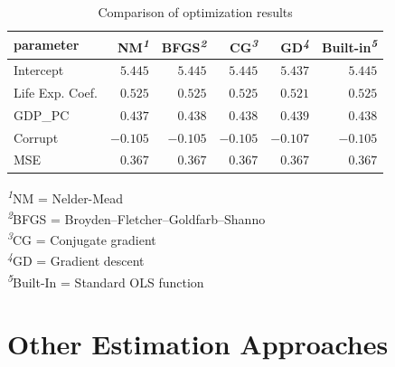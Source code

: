 \documentclass[
  letterpaper,
]{krantz}
\begin{document}
\hypertarget{tbl-optim-compare}{}
\setlength{\LTpost}{0mm}
\begin{longtable}{lrrrrr}
\caption{\label{tbl-optim-compare}Comparison of optimization results }\tabularnewline

\toprule
parameter & NM\textsuperscript{\textit{1}} & BFGS\textsuperscript{\textit{2}} & CG\textsuperscript{\textit{3}} & GD\textsuperscript{\textit{4}} & Built-in\textsuperscript{\textit{5}} \\ 
\midrule\addlinespace[2.5pt]
Intercept & \textcolor[HTML]{404040}{$5.445$} & \textcolor[HTML]{404040}{$5.445$} & \textcolor[HTML]{404040}{$5.445$} & \textcolor[HTML]{404040}{$5.437$} & \textcolor[HTML]{404040}{$5.445$} \\ 
Life Exp. Coef. & \textcolor[HTML]{404040}{$0.525$} & \textcolor[HTML]{404040}{$0.525$} & \textcolor[HTML]{404040}{$0.525$} & \textcolor[HTML]{404040}{$0.521$} & \textcolor[HTML]{404040}{$0.525$} \\ 
GDP\_PC & \textcolor[HTML]{404040}{$0.437$} & \textcolor[HTML]{404040}{$0.438$} & \textcolor[HTML]{404040}{$0.438$} & \textcolor[HTML]{404040}{$0.439$} & \textcolor[HTML]{404040}{$0.438$} \\ 
Corrupt & \textcolor[HTML]{404040}{$-0.105$} & \textcolor[HTML]{404040}{$-0.105$} & \textcolor[HTML]{404040}{$-0.105$} & \textcolor[HTML]{404040}{$-0.107$} & \textcolor[HTML]{404040}{$-0.105$} \\ 
MSE & \textcolor[HTML]{404040}{$0.367$} & \textcolor[HTML]{404040}{$0.367$} & \textcolor[HTML]{404040}{$0.367$} & \textcolor[HTML]{404040}{$0.367$} & \textcolor[HTML]{404040}{$0.367$} \\ 
\bottomrule
\end{longtable}
\begin{minipage}{\linewidth}
\textsuperscript{\textit{1}}NM = Nelder-Mead\\
\textsuperscript{\textit{2}}BFGS = Broyden–Fletcher–Goldfarb–Shanno\\
\textsuperscript{\textit{3}}CG = Conjugate gradient\\
\textsuperscript{\textit{4}}GD = Gradient descent\\
\textsuperscript{\textit{5}}Built-In = Standard OLS function\\
\end{minipage}

\section{Other Estimation Approaches}\label{sec-estim-other}
\end{document}
